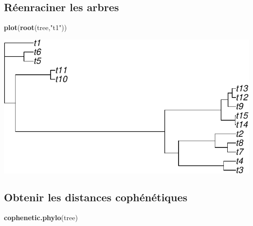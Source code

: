 \documentclass[
]{book}
\newenvironment{Shaded}{\begin{snugshade}}{\end{snugshade}}
\newcommand{\FunctionTok}[1]{\textcolor[rgb]{0.13,0.29,0.53}{\textbf{#1}}}
\newcommand{\NormalTok}[1]{#1}
\newcommand{\StringTok}[1]{\textcolor[rgb]{0.31,0.60,0.02}{#1}}
\begin{document}
\subsection{Réenraciner les arbres}\label{ruxe9enraciner-les-arbres}

\begin{Shaded}
\begin{Highlighting}[]
\FunctionTok{plot}\NormalTok{(}\FunctionTok{root}\NormalTok{(tree,}\StringTok{"t1"}\NormalTok{))}
\end{Highlighting}
\end{Shaded}

\includegraphics{pcm-workshop_files/figure-latex/Reroot trees-1.pdf}

\subsection{Obtenir les distances cophénétiques}\label{obtenir-les-distances-cophuxe9nuxe9tiques}

\begin{Shaded}
\begin{Highlighting}[]
\FunctionTok{cophenetic.phylo}\NormalTok{(tree)}
\end{Highlighting}
\end{Shaded}
\end{document}
